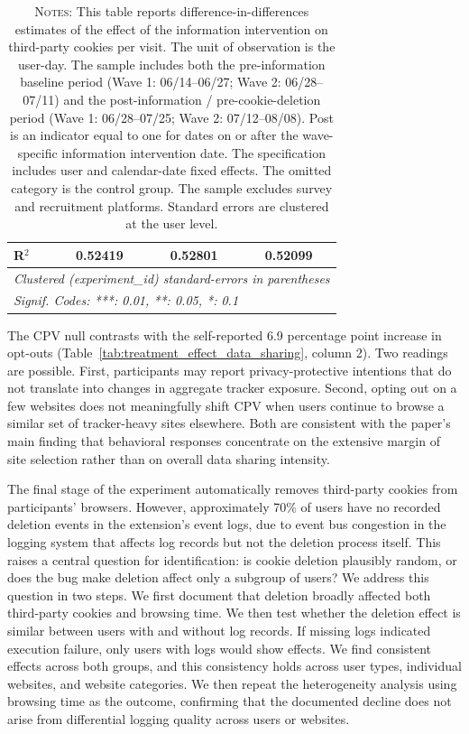 \documentclass[12pt]{article}
\theoremstyle{definition}
\theoremstyle{remark}
\begin{document}
\begin{appendix}
\begin{table}[H]
{\begin{tabular}{lccc}
   R$^2$                                    & 0.52419        & 0.52801        & 0.52099\\
   \midrule \midrule
   \multicolumn{4}{l}{\emph{Clustered (experiment\_id) standard-errors in parentheses}}\\
   \multicolumn{4}{l}{\emph{Signif. Codes: ***: 0.01, **: 0.05, *: 0.1}}\\
\end{tabular}
}
\caption*{\scriptsize \textsc{Notes}: This table reports difference-in-differences estimates of the effect of the information intervention on third-party cookies per visit. The unit of observation is the user-day. The sample includes both the pre-information baseline period (Wave 1: 06/14--06/27; Wave 2: 06/28--07/11) and the post-information / pre-cookie-deletion period (Wave 1: 06/28--07/25; Wave 2: 07/12--08/08). Post is an indicator equal to one for dates on or after the wave-specific information intervention date. The specification includes user and calendar-date fixed effects. The omitted category is the control group. The sample excludes survey and recruitment platforms. Standard errors are clustered at the user level.}
\end{table}

The CPV null contrasts with the self-reported 6.9 percentage point increase in opt-outs (Table~\ref{tab:treatment_effect_data_sharing}, column 2). Two readings are possible. First, participants may report privacy-protective intentions that do not translate into changes in aggregate tracker exposure. Second, opting out on a few websites does not meaningfully shift CPV when users continue to browse a similar set of tracker-heavy sites elsewhere. Both are consistent with the paper's main finding that behavioral responses concentrate on the extensive margin of site selection rather than on overall data sharing intensity.

The final stage of the experiment automatically removes third-party cookies from participants' browsers. However, approximately 70\% of users have no recorded deletion events in the extension's event logs, due to event bus congestion in the logging system that affects log records but not the deletion process itself. This raises a central question for identification: is cookie deletion plausibly random, or does the bug make deletion affect only a subgroup of users? We address this question in two steps. We first document that deletion broadly affected both third-party cookies and browsing time. We then test whether the deletion effect is similar between users with and without log records. If missing logs indicated execution failure, only users with logs would show effects. We find consistent effects across both groups, and this consistency holds across user types, individual websites, and website categories. We then repeat the heterogeneity analysis using browsing time as the outcome, confirming that the documented decline does not arise from differential logging quality across users or websites.


\end{appendix}
\end{document}
